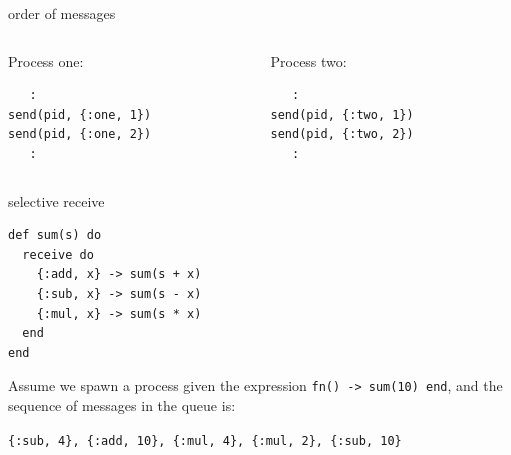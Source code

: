 \begin{frame}[fragile]{order of messages}

  \begin{columns}
    \begin{column}{0.5\textwidth}
Process one:
\begin{verbatim}
   :
send(pid, {:one, 1})
send(pid, {:one, 2})
   :
\end{verbatim}
    \end{column}
    \begin{column}{0.5\textwidth}
Process two:
\begin{verbatim}
   :
send(pid, {:two, 1})
send(pid, {:two, 2})
   :
\end{verbatim}
    \end{column}
  \end{columns}
  
\end{frame}

\begin{frame}[fragile]{selective receive}

\begin{verbatim}
def sum(s) do
  receive do
    {:add, x} -> sum(s + x)
    {:sub, x} -> sum(s - x)
    {:mul, x} -> sum(s * x)
  end
end
\end{verbatim}

\pause\vspace{10pt}

Assume we spawn a process given the expression {\tt fn() -> sum(10) end}, \pause and the sequence of messages in the queue is:

\vspace{10pt}
{\tt \{:sub, 4\}, \{:add, 10\}, \{:mul, 4\}, \{:mul, 2\}, \{:sub, 10\}}

\end{frame}



